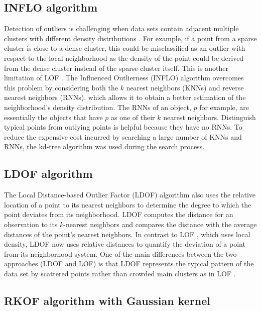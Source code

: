 \documentclass{agujournal2018}
\begin{document}
\subsection*{INFLO algorithm}\label{inflo-algorithm}

Detection of outliers is challenging when data sets contain adjacent
multiple clusters with different density distributions
\citep{jin2006ranking}. For example, if a point from a sparse cluster
is close to a dense cluster, this could be misclassified as an outlier
with respect to the local neighborhood as the density of the point could
be derived from the dense cluster instead of the sparse cluster itself.
This is another limitation of LOF \citep{breunig2000lof}. The
Influenced Outlierness (INFLO) algorithm \citep{jin2006ranking}
overcomes this problem by considering both the \(k\) nearest neighbors
(KNNs) and reverse nearest neighbors (RNNs), which allows it to obtain a
better estimation of the neighborhood's density distribution. The RNNs
of an object, \(p\) for example, are essentially the objects that have
\(p\) as one of their \(k\) nearest neighbors. Distinguish typical
points from outlying points is helpful because they have no RNNs. To
reduce the expensive cost incurred by searching a large number of KNNs
and RNNs, the kd-tree algorithm was used during the search process.

\subsection*{LDOF algorithm}\label{ldof-algorithm}
The Local Distance-based Outlier Factor (LDOF) algorithm
\citep{zhang2009new} also uses the relative location of a point to
its nearest neighbors to determine the degree to which the point
deviates from its neighborhood. LDOF computes the distance for an
observation to its \(k\)-nearest neighbors and compares the distance
with the average distances of the point's nearest neighbors. In contrast
to LOF \citep{breunig2000lof}, which uses local density, LDOF now
uses relative distances to quantify the deviation of a point from its
neighborhood system. One of the main differences between the two
approaches (LDOF and LOF) is that LDOF represents the typical pattern of
the data set by scattered points rather than crowded main clusters as in
LOF \citep{zhang2009new}.

\subsection*{RKOF algorithm with Gaussian
kernel}\label{rkof-algorithm-with-gaussian-kernel}
\end{document}
